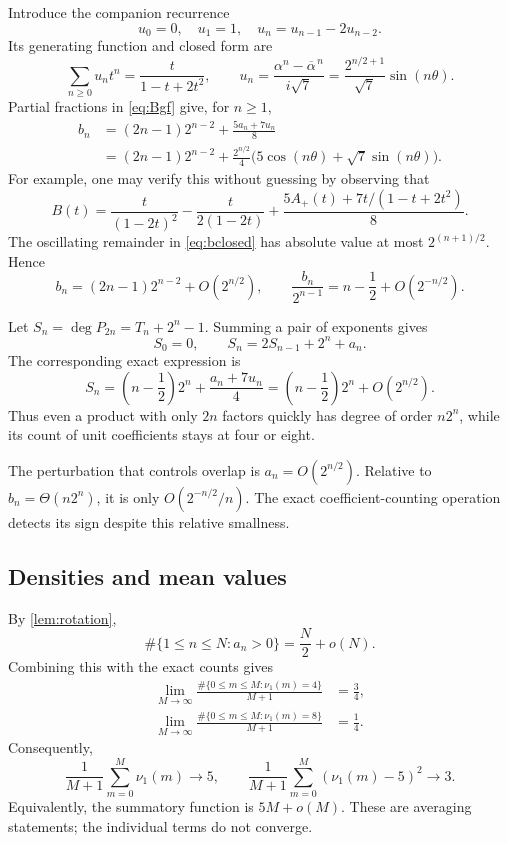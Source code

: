 \documentclass[11pt]{article}
\theoremstyle{definition}\newtheorem{definition}[theorem]{Definition}
\theoremstyle{remark}\newtheorem{remark}[theorem]{Remark}
\newcommand{\nuone}{\nu_1}
\begin{document}
Introduce the companion recurrence
\[
 u_0=0,\quad u_1=1,\quad u_n=u_{n-1}-2u_{n-2}.
\]
Its generating function and closed form are
\[
 \sum_{n\geq0}u_nt^n=\frac{t}{1-t+2t^2},\qquad
 u_n=\frac{\alpha^n-\overline\alpha^{\,n}}{i\sqrt7}
     =\frac{2^{n/2+1}}{\sqrt7}\sin(n\theta).
\]
Partial fractions in \eqref{eq:Bgf} give, for $n\geq1$,
\begin{align}
 b_n&=(2n-1)2^{n-2}+\frac{5a_n+7u_n}{8}\label{eq:bclosed}\\
    &=(2n-1)2^{n-2}
      +\frac{2^{n/2}}4\bigl(5\cos(n\theta)+\sqrt7\sin(n\theta)\bigr).
 \nonumber
\end{align}
For example, one may verify this without guessing by observing that
\[
 B(t)=\frac{t}{(1-2t)^2}-\frac{t}{2(1-2t)}
      +\frac{5A_+(t)+7t/(1-t+2t^2)}8.
\]
The oscillating remainder in \eqref{eq:bclosed} has absolute value at most $2^{(n+1)/2}$. Hence
\begin{equation}\label{eq:basymptotic}
 b_n=(2n-1)2^{n-2}+O(2^{n/2}),\qquad
 \frac{b_n}{2^{n-1}}=n-\frac12+O(2^{-n/2}).
\end{equation}

Let $S_n=\deg P_{2n}=T_n+2^n-1$. Summing a pair of exponents gives
\[
 S_0=0,\qquad S_n=2S_{n-1}+2^n+a_n.
\]
The corresponding exact expression is
\begin{equation}\label{eq:Sclosed}
 S_n=\left(n-\frac12\right)2^n+\frac{a_n+7u_n}{4}
    =\left(n-\frac12\right)2^n+O(2^{n/2}).
\end{equation}
Thus even a product with only $2n$ factors quickly has degree of order $n2^n$, while its count of unit coefficients stays at four or eight.

The perturbation that controls overlap is $a_n=O(2^{n/2})$. Relative to $b_n=\Theta(n2^n)$, it is only $O(2^{-n/2}/n)$. The exact coefficient-counting operation detects its sign despite this relative smallness.

\subsection{Densities and mean values}

By \cref{lem:rotation},
\begin{equation}\label{eq:signfreq}
 \#\{1\leq n\leq N:a_n>0\}=\frac N2+o(N).
\end{equation}
Combining this with the exact counts gives
\begin{equation}\label{eq:frequencies}
 \begin{aligned}
 \lim_{M\to\infty}\frac{\#\{0\leq m\leq M:\nuone(m)=4\}}{M+1}&=\frac34,\\
 \lim_{M\to\infty}\frac{\#\{0\leq m\leq M:\nuone(m)=8\}}{M+1}&=\frac14.
 \end{aligned}
\end{equation}
Consequently,
\begin{equation}\label{eq:meanvariance}
 \frac1{M+1}\sum_{m=0}^M\nuone(m)\longrightarrow5,\qquad
 \frac1{M+1}\sum_{m=0}^M(\nuone(m)-5)^2\longrightarrow3.
\end{equation}
Equivalently, the summatory function is $5M+o(M)$. These are averaging statements; the individual terms do not converge.
\end{document}
